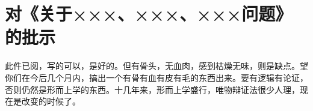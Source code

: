 \section[对《关于×××、×××、×××问题》的批示（一九六四年十二月十二日）]{对《关于×××、×××、×××问题》的批示}


此件已阅，写的可以，是好的。但有骨头，无血肉，感到枯燥无味，则是缺点。望你们在今后几个月内，搞出一个有骨有血有皮有毛的东西出来。要有逻辑有论证，否则仍然是形而上学的东西。十几年来，形而上学盛行，唯物辩证法很少人理，现在是改变的时候了。


